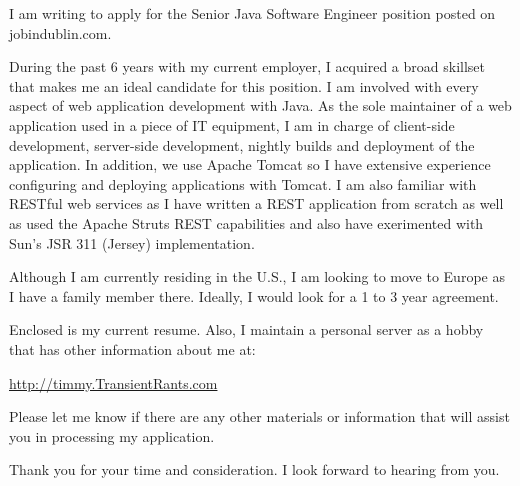 \documentclass[10pt,stdletter,dateno]{newlfm}
\begin{document}
\begin{newlfm}

I am writing to apply for the Senior Java Software Engineer position posted on jobindublin.com.

During the past 6 years with my current employer, I acquired a broad skillset 
that makes me an ideal candidate for this position.  I am involved with every aspect of web application 
development with Java.  As the sole maintainer of a web application used in a piece of IT equipment, I am 
in charge of client-side development, server-side development, nightly builds and deployment 
of the application.  In addition, we use Apache Tomcat so I have extensive experience configuring and 
deploying applications with Tomcat.  I am also familiar with RESTful web services as I have written 
a REST application from scratch as well as used the Apache Struts REST capabilities and also have exerimented with 
Sun's JSR 311 (Jersey) implementation. 

Although I am currently residing in the U.S., I am looking to move to Europe as I have a family member there.  
Ideally, I would look for a 1 to 3 year agreement.

Enclosed is my current resume.  Also, I maintain a personal server as a hobby that has 
other information about me at:

\url{http://timmy.TransientRants.com}

Please let me know if there are any other materials or information that will assist you in processing my application.

Thank you for your time and consideration.  I look forward to hearing from you.

\end{newlfm}
\end{document}

